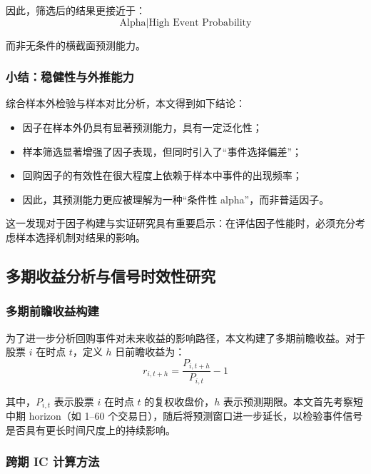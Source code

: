 \documentclass[a4paper,10pt]{article}
\begin{document}
因此，筛选后的结果更接近于：
\begin{equation}
\text{Alpha} \mid \text{High Event Probability}
\end{equation}

而非无条件的横截面预测能力。

\subsubsection{小结：稳健性与外推能力}

综合样本外检验与样本对比分析，本文得到如下结论：

\begin{itemize}
    \item 因子在样本外仍具有显著预测能力，具有一定泛化性；
    
    \item 样本筛选显著增强了因子表现，但同时引入了“事件选择偏差”；
    
    \item 回购因子的有效性在很大程度上依赖于样本中事件的出现频率；
    
    \item 因此，其预测能力更应被理解为一种“条件性 alpha”，而非普适因子。
\end{itemize}

这一发现对于因子构建与实证研究具有重要启示：在评估因子性能时，必须充分考虑样本选择机制对结果的影响。




\subsection{多期收益分析与信号时效性研究}

\subsubsection{多期前瞻收益构建}

为了进一步分析回购事件对未来收益的影响路径，本文构建了多期前瞻收益。对于股票 $i$ 在时点 $t$，定义 $h$ 日前瞻收益为：
\begin{equation}
r_{i,t+h} = \frac{P_{i,t+h}}{P_{i,t}} - 1
\end{equation}

其中，$P_{i,t}$ 表示股票 $i$ 在时点 $t$ 的复权收盘价，$h$ 表示预测期限。本文首先考察短中期 horizon（如 1--60 个交易日），随后将预测窗口进一步延长，以检验事件信号是否具有更长时间尺度上的持续影响。

\subsubsection{跨期 IC 计算方法}
\end{document}
